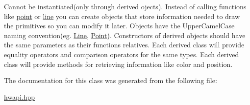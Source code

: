 Cannot be instantiated(only through derived ojects). Instead of calling functions like \mbox{\hyperlink{namespacedummy__api_a249a7c0ef8dbebf1440e41f7a5c0298f}{point}} or \mbox{\hyperlink{namespacedummy__api_a7bac2a56021c552911f6dc5ae4c8f5ad}{line}} you can create objects that store information needed to draw the primitives so you can modify it later. Objects have the Upper\+Camel\+Case naming convention(eg. \mbox{\hyperlink{classdummy__api_1_1Line}{Line}}, \mbox{\hyperlink{classdummy__api_1_1Point}{Point}}). Constructors of derived objects should have the same parameters as their functions relatives. Each derived class will provide equality operators and comparison operators for the same types. Each derived class will provide methods for retrieving information like color and position. 

The documentation for this class was generated from the following file\+:\begin{DoxyCompactItemize}
\item 
\mbox{\hyperlink{hwapi_8hpp}{hwapi.\+hpp}}\end{DoxyCompactItemize}
